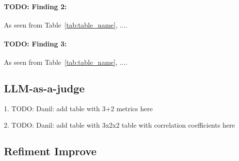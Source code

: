 \documentclass[11pt]{article}
\begin{document}
\paragraph{TODO: Finding 2:} As seen from Table~\ref{tab:table_name}, ....

\paragraph{TODO: Finding 3:} As seen from Table~\ref{tab:table_name}, ....


\subsection{LLM-as-a-judge}

1. TODO: Danil: add table with 3+2 metrics here 

2. TODO: Danil: add table with 3x2x2 table with correlation coefficients here 

\subsection{Refiment Improve}

\end{document}
